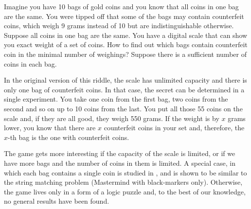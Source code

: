 Imagine you have 10 bags of gold coins and
  you know that all coins in one bag are the same.
You were tipped off that some of the bags may contain counterfeit coins,
  which weigh 9 grams instead of 10 but are indistinguishable otherwise.
Suppose all coins in one bag are the same.
You have a digital scale that can show you exact weight of a set of coins.
How to find out which bags contain counterfeit coin in
  the minimal number of weighings?
Suppose there is a sufficient number of coins in each bag.

In the original version of this riddle, the scale has unlimited capacity and
  there is only one bag of counterfeit coins.
In that case, the secret can be determined in a single experiment.
You take one coin from the first bag, two coins from the second and so on up to
  10 coins from the last.
You put all those 55 coins on the scale and, if they are all good,
  they weigh 550 grams.
If the weight is by $x$ grams lower, you know that there are $x$ counterfeit
  coins in your set and, therefore,
  the $x$-th bag is the one with counterfeit coins.

The game gets more interesting if the capacity of the scale is limited, or
  if we have more bags and the number of coins in them is limited.
A special case, in which each bag contains a single coin is
  studied in \cite{erdos-two}, and is shown to be similar to the
  string matching problem (Mastermind with black-markers only).
Otherwise, the game lives only in a form of a logic puzzle and,
  to the best of our knowledge, no general results have been found.
